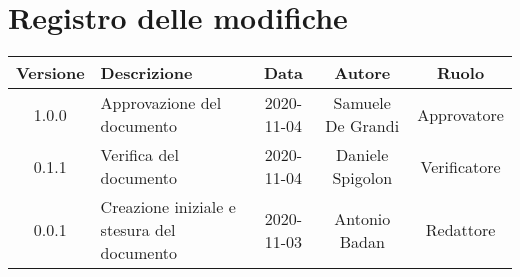 \section*{Registro delle modifiche}

\begin{center}
	\begin{longtable}{|c|p{5cm}|c|c|c|}
	\hline
	\rowcolor{lighter-grayer}
	\textbf{Versione} & \textbf{Descrizione} & \textbf{Data} & \textbf{Autore} & \textbf{Ruolo} \\
	\hline
	\endfirsthead


	1.0.0 & Approvazione del documento & 2020-11-04 & Samuele De Grandi & Approvatore \\
	\hline
	0.1.1 & Verifica del documento & 2020-11-04 & Daniele Spigolon & Verificatore \\
	\hline
	0.0.1 & Creazione iniziale e stesura del documento & 2020-11-03 & Antonio Badan & Redattore \\
	\hline
	\end{longtable}
\end{center}